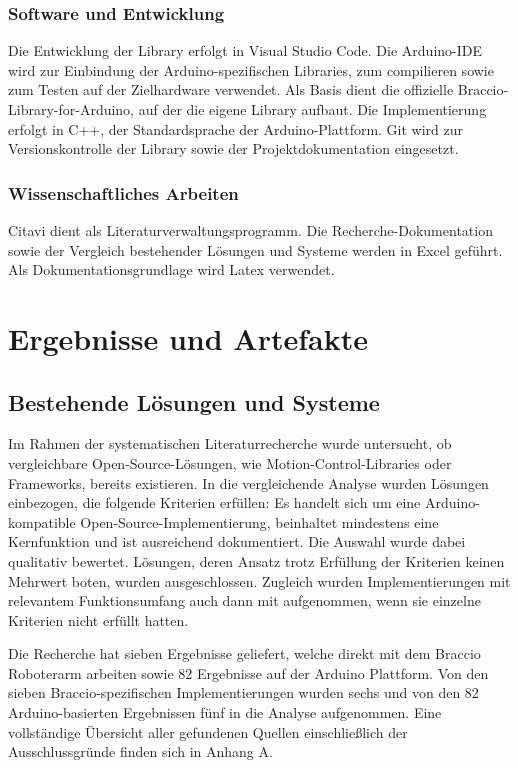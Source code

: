 \documentclass[12pt,a4paper]{article}
\begin{document}
\subsubsection*{Software und Entwicklung}
Die Entwicklung der Library erfolgt in Visual Studio Code. Die Arduino-IDE wird zur Einbindung der Arduino-spezifischen Libraries, zum compilieren sowie zum Testen auf der Zielhardware verwendet. Als Basis dient die offizielle Braccio-Library-for-Arduino, auf der die eigene Library aufbaut. Die Implementierung erfolgt in C++, der Standardsprache der Arduino-Plattform. Git wird zur Versionskontrolle der Library sowie der Projektdokumentation eingesetzt.

\subsubsection*{Wissenschaftliches Arbeiten}
Citavi dient als Literaturverwaltungsprogramm. Die Recherche-Dokumentation sowie der Vergleich bestehender Lösungen und Systeme werden in Excel geführt. Als Dokumentationsgrundlage wird Latex verwendet.

\newpage
\section{Ergebnisse und Artefakte}

\subsection{Bestehende Lösungen und Systeme}
\label{sec:Systeme}

Im Rahmen der systematischen Literaturrecherche wurde untersucht, ob vergleichbare Open-Source-Lösungen, wie Motion-Control-Libraries oder Frameworks, bereits existieren. In die vergleichende Analyse wurden Lösungen einbezogen, die folgende Kriterien erfüllen: Es handelt sich um eine Arduino-kompatible Open-Source-Implementierung, beinhaltet mindestens eine Kernfunktion und ist ausreichend dokumentiert. Die Auswahl wurde dabei qualitativ bewertet. Lösungen, deren Ansatz trotz Erfüllung der Kriterien keinen Mehrwert boten, wurden ausgeschlossen. Zugleich wurden Implementierungen mit relevantem Funktionsumfang auch dann mit aufgenommen, wenn sie einzelne Kriterien nicht erfüllt hatten. 

Die Recherche hat sieben Ergebnisse geliefert, welche direkt mit dem Braccio Roboterarm arbeiten sowie 82 Ergebnisse auf der Arduino Plattform. Von den sieben Braccio-spezifischen Implementierungen wurden sechs und von den 82 Arduino-basierten Ergebnissen fünf in die Analyse aufgenommen. Eine vollständige Übersicht aller gefundenen Quellen einschließlich der Ausschlussgründe finden sich in Anhang A.
\end{document}
